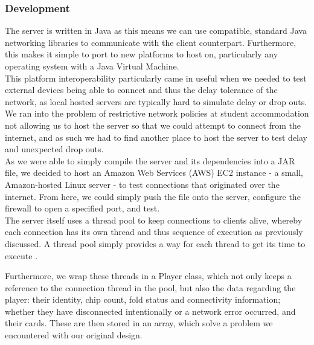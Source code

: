 \documentclass[11pt]{article}
\begin{document}
\subsubsection{Development}
The server is written in Java as this means we can use compatible, standard Java networking libraries to communicate with the client counterpart. Furthermore, this makes it simple to port to new platforms to host on, particularly any operating system with a Java Virtual Machine. \\

This platform interoperability particularly came in useful when we needed to test external devices being able to connect and thus the delay tolerance of the network, as local hosted servers are typically hard to simulate delay or drop outs. We ran into the problem of restrictive network policies at student accommodation not allowing us to host the server so that we could attempt to connect from the internet, and as such we had to find another place to host the server to test delay and unexpected drop outs. \\

As we were able to simply compile the server and its dependencies into a JAR file, we decided to host an Amazon Web Services (AWS) EC2 instance - a small, Amazon-hosted Linux server - to test connections that originated over the internet. From here, we could simply push the file onto the server, configure the firewall to open a specified port, and test. \\

The server itself uses a thread pool to keep connections to clients alive, whereby each connection has its own thread and thus sequence of execution as previously discussed. A thread pool simply provides a way for each thread to get its time to execute \cite{threadpool}. \\ 


\newpage

Furthermore, we wrap these threads in a Player class, which not only keeps a reference to the connection thread in the pool, but also the data regarding the player: their identity, chip count, fold status and connectivity information; whether they have disconnected intentionally or a network error occurred, and their cards. These are then stored in an array, which solve a problem we encountered with our original design.
\end{document}
